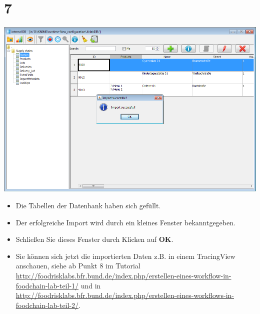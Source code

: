 \documentclass{beamer}
\begin{document}
\section{7}
\begin{frame}
	\begin{center}
  		\includegraphics[height=0.6\textheight]{7.png}
	\end{center}
	\begin{itemize}
		\item Die Tabellen der Datenbank haben sich gefüllt.
		\item Der erfolgreiche Import wird durch ein kleines Fenster  bekanntgegeben.
        \item Schließen Sie dieses Fenster durch Klicken auf \textbf{OK}.
        \item Sie können sich jetzt die importierten Daten z.B. in einem TracingView anschauen, siehe ab Punkt 8 im Tutorial \url{http://foodrisklabs.bfr.bund.de/index.php/erstellen-eines-workflow-in-foodchain-lab-teil-1/} und in \url{http://foodrisklabs.bfr.bund.de/index.php/erstellen-eines-workflows-in-foodchain-lab-teil-2/}.
	\end{itemize}
\end{frame}
\end{document}
